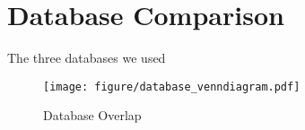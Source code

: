 \section{Database Comparison}\label{sec:database_comparison}
The three databases we used

\begin{figure}
    \caption{Database Overlap\label{fig:database_overlap}}
    \texttt{[image: figure/database\_venndiagram.pdf]}
\end{figure}
